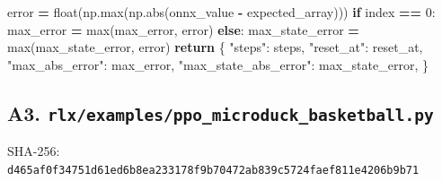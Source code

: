 \documentclass[
  american,
  11pt,
  letterpaper,
]{article}
\newenvironment{Shaded}{\begin{snugshade}}{\end{snugshade}}
\newcommand{\BuiltInTok}[1]{#1}
\newcommand{\ControlFlowTok}[1]{\textcolor[rgb]{0.13,0.29,0.53}{\textbf{#1}}}
\newcommand{\DecValTok}[1]{\textcolor[rgb]{0.00,0.00,0.81}{#1}}
\newcommand{\NormalTok}[1]{#1}
\newcommand{\OperatorTok}[1]{\textcolor[rgb]{0.81,0.36,0.00}{\textbf{#1}}}
\newcommand{\StringTok}[1]{\textcolor[rgb]{0.31,0.60,0.02}{#1}}
\renewenvironment{Shaded}{\par\smallskip}{\par\smallskip}
\begin{document}
\begin{Shaded}
\begin{Highlighting}[]
\NormalTok{                error }\OperatorTok{=} \BuiltInTok{float}\NormalTok{(np.}\BuiltInTok{max}\NormalTok{(np.}\BuiltInTok{abs}\NormalTok{(onnx\_value }\OperatorTok{{-}}\NormalTok{ expected\_array)))}
                \ControlFlowTok{if}\NormalTok{ index }\OperatorTok{==} \DecValTok{0}\NormalTok{:}
\NormalTok{                    max\_error }\OperatorTok{=} \BuiltInTok{max}\NormalTok{(max\_error, error)}
                \ControlFlowTok{else}\NormalTok{:}
\NormalTok{                    max\_state\_error }\OperatorTok{=} \BuiltInTok{max}\NormalTok{(max\_state\_error, error)}
    \ControlFlowTok{return}\NormalTok{ \{}
        \StringTok{"steps"}\NormalTok{: steps, }\StringTok{"reset\_at"}\NormalTok{: reset\_at, }\StringTok{"max\_abs\_error"}\NormalTok{: max\_error,}
        \StringTok{"max\_state\_abs\_error"}\NormalTok{: max\_state\_error,}
\NormalTok{    \}}
\end{Highlighting}
\end{Shaded}

\subsection{\texorpdfstring{A3.
\texttt{rlx/\allowbreak{}examples\allowbreak{}/\allowbreak{}ppo\_\allowbreak{}microduc\allowbreak{}k\_\allowbreak{}basketba\allowbreak{}ll.py}}{A3. }}\label{a3.-rlxexamplesppo_microduck_basketball.py}

SHA-256:
\texttt{d465af0f\allowbreak{}34751d61\allowbreak{}ed6b8ea2\allowbreak{}33178f9b\allowbreak{}70472ab8\allowbreak{}39c5724f\allowbreak{}aef811e4\allowbreak{}206b9b71\allowbreak{}}
\end{document}
